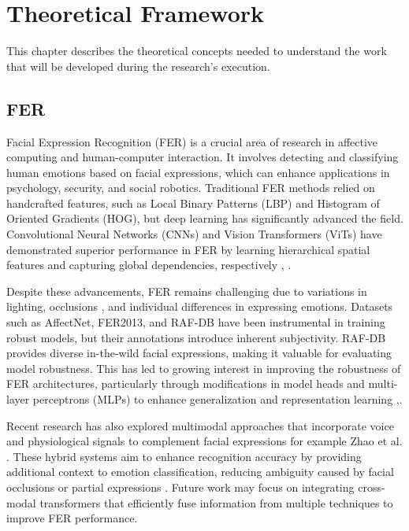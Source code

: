 \chapter{Theoretical Framework}
\label{chapter:theoretical-framework}


This chapter describes the theoretical concepts needed to understand the work that will be developed during the research's execution.


\section{FER}

Facial Expression Recognition (FER) is a crucial area of research in affective computing and human-computer interaction. It involves detecting and classifying human emotions based on facial expressions, which can enhance applications in psychology, security, and social robotics. Traditional FER methods relied on handcrafted features, such as Local Binary Patterns (LBP) and Histogram of Oriented Gradients (HOG), but deep learning has significantly advanced the field. Convolutional Neural Networks (CNNs) and Vision Transformers (ViTs) have demonstrated superior performance in FER by learning hierarchical spatial features and capturing global dependencies, respectively  \cite{zheng_poster_2022}, \cite{kollias_affect_2021}. 

Despite these advancements, FER remains challenging due to variations in lighting, occlusions \cite{guo_occrob_2023}, and individual differences in expressing emotions. Datasets such as AffectNet, FER2013, and RAF-DB have been instrumental in training robust models, but their annotations introduce inherent subjectivity. RAF-DB provides diverse in-the-wild facial expressions, making it valuable for evaluating model robustness. This has led to growing interest in improving the robustness of FER architectures, particularly through modifications in model heads and multi-layer perceptrons (MLPs) to enhance generalization and representation learning \cite{abdullah_activator_2024},\cite{yu_rethinking_2021}. 

Recent research has also explored multimodal approaches that incorporate voice and physiological signals to complement facial expressions for example Zhao et al. \cite{zhao_former-dfer_2021}. These hybrid systems aim to enhance recognition accuracy by providing additional context to emotion classification, reducing ambiguity caused by facial occlusions or partial expressions \cite{wang_survey_2024}. Future work may focus on integrating cross-modal transformers that efficiently fuse information from multiple techniques to improve FER performance. 


